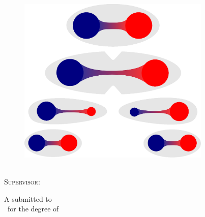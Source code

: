 \documentclass[../main.tex]{subfiles} %
\newcommand\TitleHUGE{\fontsize{31}{40}\selectfont} %
\begin{document}


\begin{titlepage} %
    \centering
    
    \textsc{\TitleHUGE{\Title}}\\
    
    \begin{figure}[ht!] %
        \begin{center}
            \includegraphics[height=8cm]{frontpageImages/QuarkConfinement.eps}
        \end{center}
    \end{figure} %
    
    \vfill
    
    \textsc{\huge{\Author}}\\\vspace{2em} %
    \textsc{\Large{Supervisor: \Supervisor}}\\\bigskip %
    
    \vfill
    
    A \MakeLowercase{\Doctype} submitted to\\
    \University\ for the degree of\\
    {\large\textsc{\Degree}\bigskip}\\
    

\end{titlepage}
\end{document}
